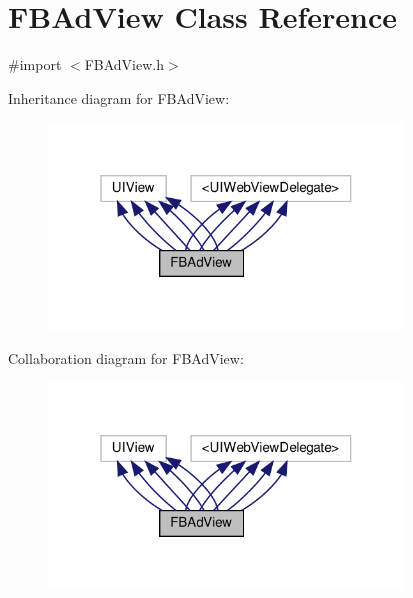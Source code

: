 \hypertarget{interfaceFBAdView}{}\section{F\+B\+Ad\+View Class Reference}
\label{interfaceFBAdView}


{\ttfamily \#import $<$F\+B\+Ad\+View.\+h$>$}



Inheritance diagram for F\+B\+Ad\+View\+:
\nopagebreak
\begin{figure}[H]
\begin{center}
\leavevmode
\includegraphics[width=268pt]{interfaceFBAdView__inherit__graph}
\end{center}
\end{figure}


Collaboration diagram for F\+B\+Ad\+View\+:
\nopagebreak
\begin{figure}[H]
\begin{center}
\leavevmode
\includegraphics[width=268pt]{interfaceFBAdView__coll__graph}
\end{center}
\end{figure}
